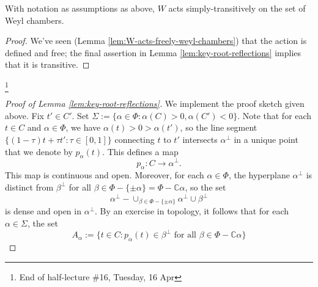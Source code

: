 \documentclass[reqno]{amsart} 
\begin{document}
\begin{corollary}
  With notation as assumptions as above, $W$ acts simply-transitively on the set of Weyl chambers.
\end{corollary}
\begin{proof}
  We've seen (Lemma \ref{lem:W-acts-freely-weyl-chambers}) that the action is defined and free; the final assertion in Lemma \ref{lem:key-root-reflections} implies that it is transitive.
\end{proof}
\footnote{End of half-lecture \#16, Tuesday, 16 Apr}


\begin{proof}
[Proof of Lemma \ref{lem:key-root-reflections}]
  We implement the proof sketch given above.  Fix $t' \in C'$.  Set $\Sigma := \{\alpha \in \Phi : \alpha(C) > 0, \alpha(C') < 0\}$.  Note that for each $t \in C$ and $\alpha \in \Phi$, we have $\alpha(t) > 0 > \alpha(t')$, so the line segment $\{(1 - \tau) t + \tau t ' : \tau \in [0,1]\}$ connecting $t$ to $t'$ intersects $\alpha^\perp$ in a unique point that we denote by $p_\alpha(t)$.  This defines a map
  \begin{equation*}
    p_\alpha : C \rightarrow \alpha^\perp.
  \end{equation*}
  This map is continuous and open.  Moreover, for each $\alpha \in \Phi$, the hyperplane $\alpha^\perp$ is distinct from $\beta^\perp$ for all $\beta \in \Phi - \{\pm \alpha \} = \Phi - \mathbb{C} \alpha$, so the set
  \begin{equation*}
    \alpha^\perp - \cup_{\beta \in \Phi - \{\pm \alpha \}} \alpha^\perp \cup \beta^{\perp}
  \end{equation*}
  is dense and open in $\alpha^\perp$.  By an exercise in topology, it follows that for each $\alpha \in \Sigma$, the set
  \begin{equation*}
    A_\alpha := \{t \in C : p_\alpha(t) \in \beta^\perp \text{ for all } \beta \in \Phi - \mathbb{C} \alpha \}
  \end{equation*}

\end{proof}
\end{document}
